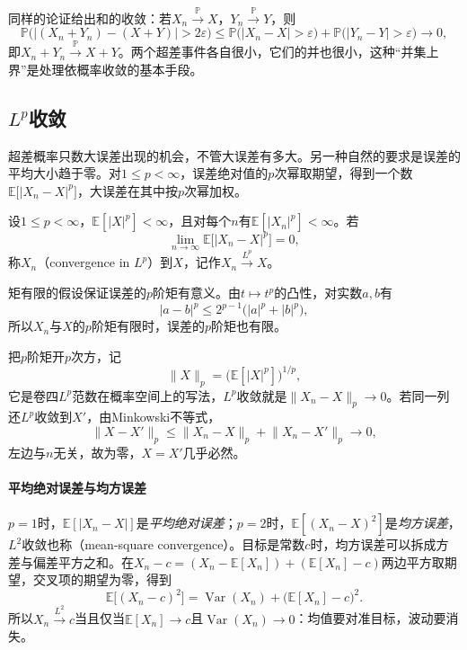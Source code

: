 同样的论证给出和的收敛：若$X_n\xrightarrow{\mathbb{P}}X$，$Y_n\xrightarrow{\mathbb{P}}Y$，则
\[
 \mathbb{P}\bigl(\lvert(X_n+Y_n)-(X+Y)\rvert>2\varepsilon\bigr)\leq\mathbb{P}\bigl(\lvert X_n-X\rvert>\varepsilon\bigr)+\mathbb{P}\bigl(\lvert Y_n-Y\rvert>\varepsilon\bigr)\to0 ,
\]
即$X_n+Y_n\xrightarrow{\mathbb{P}}X+Y$。两个超差事件各自很小，它们的并也很小，这种“并集上界”是处理依概率收敛的基本手段。

\subsection{\texorpdfstring{$L^{p}$}{Lp}收敛}
\label{sec:rvconv-lp}

超差概率只数大误差出现的机会，不管大误差有多大。另一种自然的要求是误差的平均大小趋于零。对$1\leq p<\infty$，误差绝对值的$p$次幂取期望，得到一个数$\mathbb{E}\bigl[\lvert X_n-X\rvert^{p}\bigr]$，大误差在其中按$p$次幂加权。

\begin{definition}[$L^{p}$收敛]
\label{def:rvconv-lp}
设$1\leq p<\infty$，$\mathbb{E}[\lvert X\rvert^{p}]<\infty$，且对每个$n$有$\mathbb{E}[\lvert X_n\rvert^{p}]<\infty$。若
\begin{equation}
 \lim_{n\to\infty}\mathbb{E}\bigl[\lvert X_n-X\rvert^{p}\bigr]=0 ,
 \label{eq:rvconv-lp}
\end{equation}
称$X_n$（convergence in $L^p$）到$X$，记作$X_n\xrightarrow{L^{p}}X$。
\end{definition}

矩有限的假设保证误差的$p$阶矩有意义。由$t\mapsto t^{p}$的凸性，对实数$a,b$有
\[
 \lvert a-b\rvert^{p}\leq2^{p-1}\bigl(\lvert a\rvert^{p}+\lvert b\rvert^{p}\bigr),
\]
所以$X_n$与$X$的$p$阶矩有限时，误差的$p$阶矩也有限。

把$p$阶矩开$p$次方，记
\[
 \lVert X\rVert_{p}=\bigl(\mathbb{E}[\lvert X\rvert^{p}]\bigr)^{1/p} ,
\]
它是卷四$L^{p}$范数在概率空间上的写法，$L^{p}$收敛就是$\lVert X_n-X\rVert_{p}\to0$。若同一列还$L^{p}$收敛到$X'$，由Minkowski不等式，
\[
 \lVert X-X'\rVert_{p}\leq\lVert X_n-X\rVert_{p}+\lVert X_n-X'\rVert_{p}\to0 ,
\]
左边与$n$无关，故为零，$X=X'$几乎必然。

\paragraph{平均绝对误差与均方误差}
$p=1$时，$\mathbb{E}[\lvert X_n-X\rvert]$是\emph{平均绝对误差}；$p=2$时，$\mathbb{E}[(X_n-X)^{2}]$是\emph{均方误差}，$L^{2}$收敛也称（mean-square convergence）。目标是常数$c$时，均方误差可以拆成方差与偏差平方之和。在$X_n-c=(X_n-\mathbb{E}[X_n])+(\mathbb{E}[X_n]-c)$两边平方取期望，交叉项的期望为零，得到
\begin{equation}
 \mathbb{E}\bigl[(X_n-c)^{2}\bigr]=\operatorname{Var}(X_n)+\bigl(\mathbb{E}[X_n]-c\bigr)^{2} .
 \label{eq:rvconv-mse}
\end{equation}
所以$X_n\xrightarrow{L^{2}}c$当且仅当$\mathbb{E}[X_n]\to c$且$\operatorname{Var}(X_n)\to0$：均值要对准目标，波动要消失。

